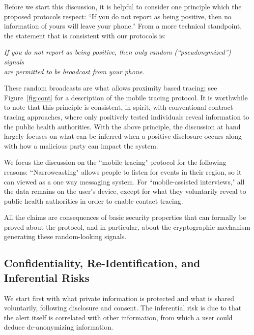 \documentclass{article}
\begin{document}
Before we start this discussion, it is helpful to consider one principle which the proposed protocols respect:
 ``If you do not report as being positive, then no information of yours will leave your phone." From a more technical standpoint, the statement that is consistent with our protocols is:
\begin{center}
 \emph{If you do not report as being positive, then only random  (``pseudonymized'') signals\\
 are permitted to be broadcast from your phone.} 
\end{center}
These random broadcasts are what allows proximity based tracing; see Figure~\ref{fig:cont} for a description of the mobile tracing protocol.
It is worthwhile to note that this principle is consistent, in spirit, with conventional contract tracing approaches, where only positively tested individuals reveal information to the public health authorities.  With the above principle, the discussion at hand largely focuses on what can be inferred when a positive disclosure occurs along with how a malicious party can impact the system.

We focus the discussion on the ``mobile tracing" protocol for the following reasons:  ``Narrowcasting" allows people to listen for events in their region, so it can viewed as a one way messaging system. For ``mobile-assisted interviews," all the data remains on the user's device, except for what they voluntarily reveal to public health authorities in order to enable contact tracing.


All the claims are consequences of basic security properties that can formally be proved about the protocol, and in particular, about the cryptographic mechanism generating these random-looking signals. 

\subsection{Confidentiality, Re-Identification, and Inferential Risks}

We start first with what private information is protected and what is shared voluntarily, following disclosure and consent.  The inferential risk is due to that the alert itself is correlated with other information, from which a user could deduce de-anonymizing information.
\end{document}

